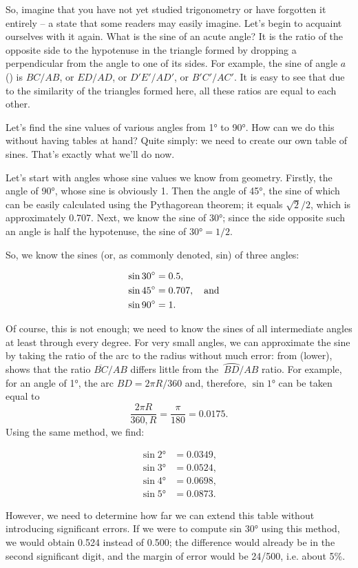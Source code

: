 So, imagine that you have not yet studied trigonometry or have forgotten it entirely -- a state that some readers may easily imagine. Let's begin to acquaint ourselves with it again. What is the sine of an acute angle? It is the ratio of the opposite side to the hypotenuse in the triangle formed by dropping a perpendicular from the angle to one of its sides. For example, the sine of angle $a$ () is $BC/AB$, or $ED/AD$, or $D'E'/AD'$, or $B'C'/AC'$. It is easy to see that due to the similarity of the triangles formed here, all these ratios are equal to each other.

Let's find the sine values of various angles from \ang{1} to \ang{90}. How can we do this without having tables at hand? Quite simply: we need to create our own table of sines. That's exactly what we'll do now.

Let's start with angles whose sine values we know from geometry. Firstly, the angle of \ang{90}, whose sine is obviously 1. Then the angle of \ang{45}, the sine of which can be easily calculated using the Pythagorean theorem; it equals $\sqrt{2}/2$, which is approximately 0.707. Next, we know the sine of \ang{30}; since the side opposite such an angle is half the hypotenuse, the sine of $\ang{30} = 1/2$.

So, we know the sines (or, as commonly denoted, sin) of three angles: 
\begin{small}
\begin{align*}%
\sin \ang{30} & = 0.5, \\
\sin \ang{45} & = 0.707, \qand \\
\sin \ang{90} & = 1.
\end{align*}
\end{small}
Of course, this is not enough; we need to know the sines of all intermediate angles at least through every degree. For very small angles, we can approximate the sine by taking the ratio of the arc to the radius without much error: from  (lower),
shows that the ratio $\overline{BC}/AB$ differs little from the $\ \wideparen{BD}/AB$ ratio. For example, for an angle of \ang{1}, the arc $BD = 2\pi R/360$ and, therefore, $\sin \ang{1}$ can be taken equal to
\begin{equation*}%
\frac{2 \pi R}{360 , R} = \frac{\pi}{180} = 0.0175. 
\end{equation*}
Using the same method, we find: 
\begin{small}
\begin{align*}%
\sin \ang{2} & = 0.0349, \\
\sin \ang{3} & = 0.0524,\\
\sin \ang{4} & = 0.0698, \\
\sin \ang{5} & = 0.0873.
\end{align*}
\end{small}
However, we need to determine how far we can extend this table without introducing significant errors. If we were to compute sin \ang{30} using this method, we would obtain 0.524 instead of 0.500; the difference would already be in the second significant digit, and the margin of error would be 24/500, i.e. about 5\%.

